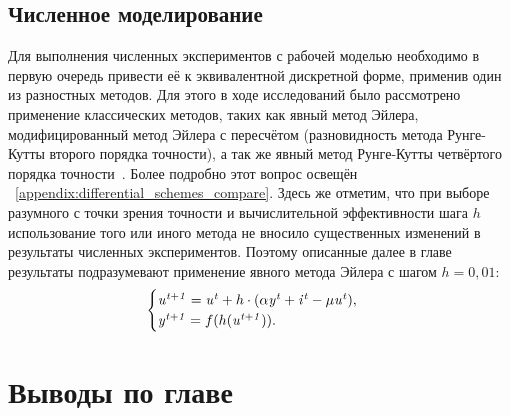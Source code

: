 \subsection{Численное моделирование}

Для выполнения численных экспериментов с рабочей моделью необходимо в первую очередь привести её к эквивалентной дискретной форме, применив один из разностных методов. Для этого в ходе исследований было рассмотрено применение классических методов, таких как явный метод Эйлера, модифицированный метод Эйлера с пересчётом (разновидность метода Рунге-Кутты второго порядка точности), а так же явный метод Рунге-Кутты четвёртого порядка точности~\cite{Hairer1990}. Более подробно этот вопрос освещён \inappendix~\ref{appendix:differential_schemes_compare}. Здесь же отметим, что при выборе разумного с точки зрения точности и вычислительной эффективности шага $h$ использование того или иного метода не вносило существенных изменений в результаты численных экспериментов. Поэтому описанные далее в главе результаты подразумевают применение явного метода Эйлера с шагом $h = 0,01$:
\begin{equation*}
    \begin{cases}
        \mathit{u^{t+1}} = \mathit{u^{t}} + h \cdot ( \alpha\mathit{y^{t}} + \mathit{i^{t}} - \mu\mathit{u^{t}} ), \\ 
        \mathit{y^{t+1}} = f(h(\mathit{u^{t+1}})).
    \end{cases}
\end{equation*}

\section{Выводы по главе \thechapter} \label{section:neuron_concls}



